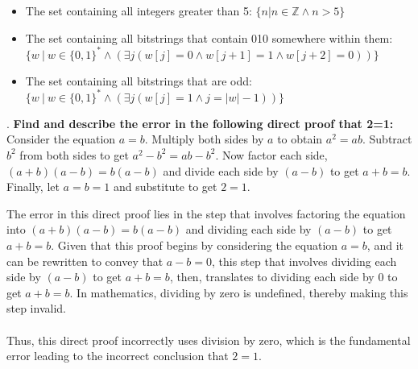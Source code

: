 \documentclass[12pt]{article}
\newcounter{quesnum}
\newcommand{\question}[2][??]{
\begin{list}{\labelitemi}{\leftmargin=2em}
\item [\arabic{quesnum}.] {} {#2}
\end{list}
\addtocounter{quesnum}{1}
}
\begin{document}
\begin{itemize}
    \item The set containing all integers greater than 5:
    $\{ n | n \in \mathbb{Z} \wedge n>5 \}$
    
    \item The set containing all bitstrings that contain 010 somewhere within them:
    $\{ w \ | \ w \in \{0,1\}^* \wedge (\exists j (w[j] = 0 \wedge w[j+1] = 1 \wedge w[j+2] = 0)) \}$ %
    \item The set containing all bitstrings that are odd:
    $\{ w \ | \ w \in \{0,1\}^* \wedge (\exists j(w[j] = 1 \wedge j=|w|-1)) \}$ %
\end{itemize}

\vspace{12pt}

\question[3]{
\textbf{Find and describe the error in the following direct proof that 2=1:} Consider the equation $a=b$. Multiply both sides by $a$ to obtain $a^2=ab$. Subtract $b^2$ from both sides to get $a^2-b^2=ab-b^2$. Now factor each side, $(a+b)(a-b)=b(a-b)$ and divide each side by $(a-b)$ to get $a+b=b$. Finally, let $a=b=1$ and substitute to get $2=1$.
}
The error in this direct proof lies in the step that involves factoring the equation into $(a+b)(a-b)=b(a-b)$ and dividing each side by $(a-b)$ to get $a+b=b$. Given that this proof begins by considering the equation $a=b$, and it can be rewritten to convey that $a-b = 0$, this step that involves dividing each side by $(a-b)$ to get $a+b=b$, then, translates to dividing each side by $0$ to get $a+b=b$. In mathematics, dividing by zero is undefined, thereby making this step invalid.\\
\\
Thus, this direct proof incorrectly uses division by zero, which is the fundamental error leading to the incorrect conclusion that $2=1$.

\vspace{12pt}
\end{document}
